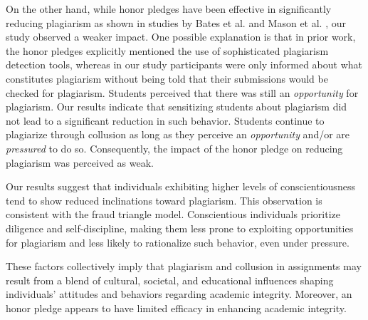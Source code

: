 On the other hand, while honor pledges have been effective in significantly reducing plagiarism as shown in studies by Bates et al. \cite{bates2016academic} and Mason et al. \cite{10.1145/3287324.3287443}, our study observed a weaker impact. One possible explanation is that in prior work, the honor pledges explicitly mentioned the use of sophisticated plagiarism detection tools, whereas in our study participants were only informed about what constitutes plagiarism without being told that their submissions would be checked for plagiarism. Students perceived that there was still an \emph{opportunity} for plagiarism. Our results indicate that sensitizing students about plagiarism did not lead to a significant reduction in such behavior. Students continue to plagiarize through collusion as long as they perceive an \textit{opportunity} and/or are \textit{pressured} to do so. Consequently, the impact of the honor pledge on reducing plagiarism was perceived as weak. 


Our results suggest that individuals exhibiting higher levels of conscientiousness tend to show reduced inclinations toward plagiarism. This observation is consistent with the fraud triangle model. Conscientious individuals prioritize diligence and self-discipline, making them less prone to exploiting opportunities for plagiarism and less likely to rationalize such behavior, even under pressure.

These factors collectively imply that plagiarism and collusion in assignments may result from a blend of cultural, societal, and educational influences shaping individuals' attitudes and behaviors regarding academic integrity. Moreover, an honor pledge appears to have limited efficacy in enhancing academic integrity.